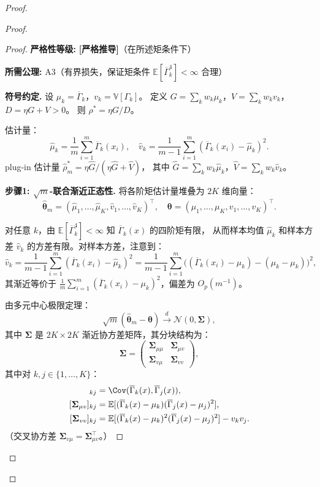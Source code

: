 \documentclass[12pt,a4paper]{article}
\newcommand{\E}{\mathbb{E}}
\newcommand{\V}{\mathbb{V}}
\newcommand{\rigorous}{\textbf{[严格推导]}}
\begin{document}
\begin{proof}
\begin{proof}
\begin{proof}
\textbf{严格性等级:} \rigorous \quad（在所述矩条件下）

\textbf{所需公理:} A3（有界损失，保证矩条件 $\E[\overline{\Gamma}_k^4]<\infty$ 合理）

\textbf{符号约定.}
设 $\mu_k = \overline{\Gamma}_k$，$v_k = \V[\Gamma_k]$。
定义 $G = \sum_k w_k \mu_k$，$V = \sum_k w_k v_k$，$D = \eta G + V > 0$。
则 $\rho^* = \eta G / D$。

估计量：
\[
\hat\mu_k = \frac1m\sum_{i=1}^m \overline{\Gamma}_k(x_i),\quad
\hat v_k = \frac1{m-1}\sum_{i=1}^m (\overline{\Gamma}_k(x_i)-\hat\mu_k)^2.
\]
plug-in 估计量 $\hat\rho^*_m = \eta\hat G / (\eta\hat G + \hat V)$，
其中 $\hat G = \sum_k w_k \hat\mu_k$，$\hat V = \sum_k w_k \hat v_k$。

\textbf{步骤1: $\sqrt{m}$-联合渐近正态性.}
将各阶矩估计量堆叠为 $2K$ 维向量：
\[
\hat{\bm\theta}_m = (\hat\mu_1,\dots,\hat\mu_K,\hat v_1,\dots,\hat v_K)^\top,\quad
{\bm\theta} = (\mu_1,\dots,\mu_K,v_1,\dots,v_K)^\top.
\]

对任意 $k$，由 $\E[\overline{\Gamma}_k^4]<\infty$ 知 $\overline{\Gamma}_k(x)$ 的四阶矩有限，
从而样本均值 $\hat\mu_k$ 和样本方差 $\hat v_k$ 的方差有限。对样本方差，注意到：
\[
\hat v_k = \frac1{m-1}\sum_{i=1}^m (\overline{\Gamma}_k(x_i)-\hat\mu_k)^2
= \frac1{m-1}\sum_{i=1}^m \big((\overline{\Gamma}_k(x_i)-\mu_k) - (\hat\mu_k-\mu_k)\big)^2,
\]
其渐近等价于 $\frac1m\sum_{i=1}^m (\overline{\Gamma}_k(x_i)-\mu_k)^2$，偏差为 $O_p(m^{-1})$。

由多元中心极限定理：
\[
\sqrt{m}(\hat{\bm\theta}_m - {\bm\theta}) \xrightarrow{d}
\mathcal{N}(0, \bm\Sigma),
\]
其中 $\bm\Sigma$ 是 $2K\times 2K$ 渐近协方差矩阵，其分块结构为：
\[
\bm\Sigma =
\begin{pmatrix}
\bm\Sigma_{\mu\mu} & \bm\Sigma_{\mu v} \\
\bm\Sigma_{v\mu} & \bm\Sigma_{vv}
\end{pmatrix},
\]
其中对 $k,j\in\{1,\dots,K\}$：
\begin{align*}
[\bm\Sigma_{\mu\mu}]_{kj} &= \Cov(\overline{\Gamma}_k(x), \overline{\Gamma}_j(x)),\\
[\bm\Sigma_{\mu v}]_{kj} &= \E[(\overline{\Gamma}_k(x)-\mu_k)(\overline{\Gamma}_j(x)-\mu_j)^2],\\
[\bm\Sigma_{vv}]_{kj} &= \E[(\overline{\Gamma}_k(x)-\mu_k)^2(\overline{\Gamma}_j(x)-\mu_j)^2] - v_k v_j.
\end{align*}
（交叉协方差 $\bm\Sigma_{v\mu} = \bm\Sigma_{\mu v}^\top$。）


\end{proof}
\end{proof}
\end{proof}
\end{document}
